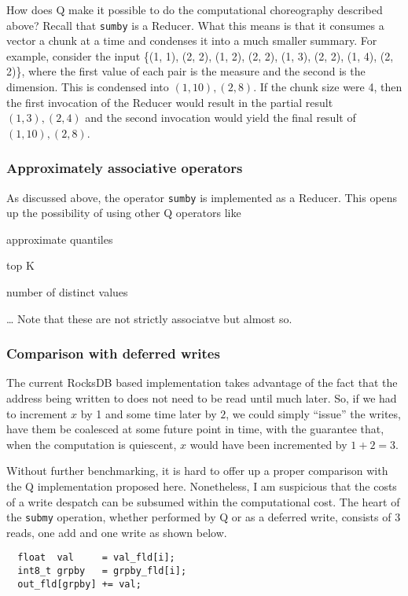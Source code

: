 How does Q make it possible to do the computational choreography described
above? Recall that {\tt sumby} is a Reducer. What this means is that it consumes
a vector a chunk at a time and condenses it into a much smaller summary. 
For example, consider the input 
\{(1, 1), (2, 2), (1, 2), (2, 2), (1, 3), (2, 2), (1, 4), (2, 2)\}, where the
first value of each pair is the measure and the second is the dimension.
This is condensed
into \((1, 10), (2, 8)\). If the chunk size were 4, then the first invocation of
the Reducer 
would result in the partial result 
\((1, 3), (2, 4)\) and the second invocation 
would yield the final result of 
\((1, 10), (2, 8)\). 

\subsubsection{Approximately associative operators}
\label{approx}

As discussed above, the operator {\tt sumby} is implemented as a Reducer.  
This opens up the possibility of using other Q operators like
\be
\item approximate quantiles
\item top K
\item number of distinct values  \cite{Flajolet07}
\item \ldots
\ee
Note that these are not strictly associatve but almost so.

\subsubsection{Comparison with deferred writes}

The current RocksDB based implementation takes advantage of the fact that the
address being written to does not need to be read until much later. So, if we
had to increment \(x\) by 1 and some time later by \(2\), we could simply
``issue'' the writes, have them be coalesced at some future point in time, with
the guarantee that, when the computation is quiescent, \(x\) would have been
incremented by \(1 + 2 = 3\).

Without further benchmarking, it is hard to offer up a proper comparison with
the Q implementation proposed here. Nonetheless, I am suspicious that the costs
of a write despatch can be subsumed within the computational cost. The heart of
the {\tt submy} operation, whether performed by Q or as a deferred write,
consists of 3 reads, one add and one write as shown below.
\begin{verbatim}
  float  val     = val_fld[i];
  int8_t grpby   = grpby_fld[i];
  out_fld[grpby] += val;
\end{verbatim}

